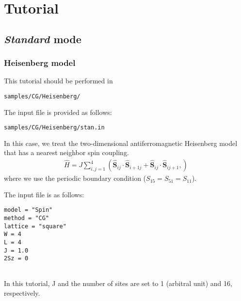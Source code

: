 \chapter{Tutorial}
\label{Ch:model}
\section{{\it Standard} mode}

\subsection{Heisenberg model}

This tutorial should be performed in 
\begin{verbatim}
samples/CG/Heisenberg/
\end{verbatim}

The input file is provided as follows:
\begin{verbatim}
samples/CG/Heisenberg/stan.in
\end{verbatim}
%
In this case, we treat the two-dimensional antiferromagnetic Heisenberg model
that has a nearest neighbor spin coupling.
\begin{align}
  {\hat H} = J \sum_{i,j=1}^{4}(
  {\hat {\boldsymbol S}}_{i j} \cdot {\hat {\boldsymbol S}}_{i+1 j} +
  {\hat {\boldsymbol S}}_{i j} \cdot {\hat {\boldsymbol S}}_{i j+1},
  )
\end{align}
where we use the periodic boundary condition ($S_{1 5} = S_{5 1}= S_{1 1}$).

The input file is as follows:
\\
\begin{minipage}{10cm}
\begin{screen}
\begin{verbatim}
model = "Spin"
method = "CG"
lattice = "square"
W = 4
L = 4
J = 1.0
2Sz = 0
\end{verbatim}
\end{screen}
\end{minipage}
%
\\
In this tutorial, J and the number of sites are set to 1 (arbitral unit)
and 16, respectively.

